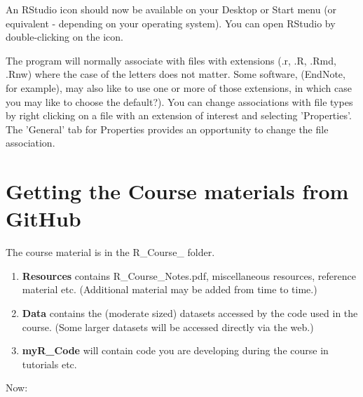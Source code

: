 \documentclass[titlepage]{book}
\begin{document}
An RStudio icon should now be available on your Desktop or Start menu (or equivalent - depending on your operating system). You can open RStudio by double-clicking on the icon.

The program will normally associate with files with extensions (.r, .R, .Rmd, .Rnw) where the case of the letters does not matter. Some software, (EndNote, for example), may also like to use one or more of those extensions, in which case you may like to choose the default?). You can change associations with file types by right clicking on a file with an extension of interest and selecting 'Properties'. The 'General' tab for Properties provides an opportunity to change the file association.

\section*{Getting the Course materials from GitHub}

The course material is in the R\_Course\_ folder. 


\begin{enumerate}
\item{\textbf{Resources} contains R\_Course\_Notes.pdf, miscellaneous resources, reference material etc. (Additional material may be added from time to time.)}\label{ResourcesFolder}
\item{\textbf{Data} contains the (moderate sized) datasets accessed by the code used in the course. (Some larger datasets will be accessed directly via the web.)}\label{DataFolder}
\item{\textbf{myR\_Code} will contain code you are developing during the course in tutorials etc.}\label{myCodeFolder}
\end{enumerate}

Now: 
\end{document}
